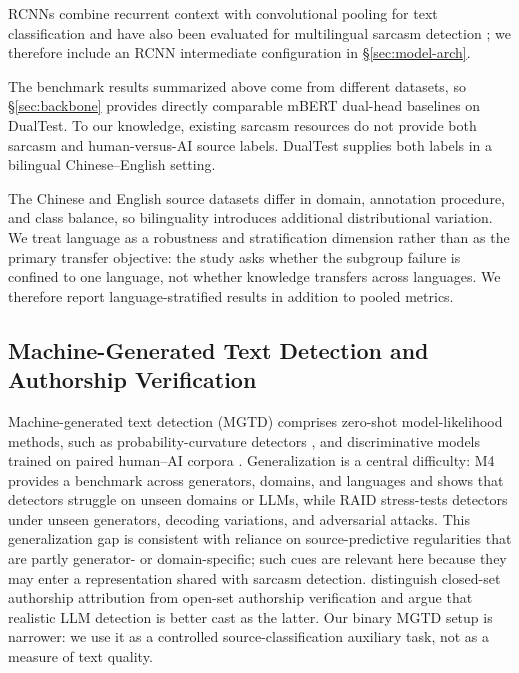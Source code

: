 \documentclass[11pt]{article}
\newcommand{\Sref}[1]{\hyperref[#1]{\S\ref*{#1}}}
\begin{document}
RCNNs combine recurrent context with convolutional pooling for text classification \citep{lai2015rcnn} and have also been evaluated for multilingual sarcasm detection \citep{yang2024influence}; we therefore include an RCNN intermediate configuration in \Sref{sec:model-arch}.

The benchmark results summarized above come from different datasets, so \Sref{sec:backbone} provides directly comparable mBERT dual-head baselines on DualTest. To our knowledge, existing sarcasm resources do not provide both sarcasm and human-versus-AI source labels. DualTest supplies both labels in a bilingual Chinese--English setting.

The Chinese and English source datasets differ in domain, annotation procedure, and class balance, so bilinguality introduces additional distributional variation. We treat language as a robustness and stratification dimension rather than as the primary transfer objective: the study asks whether the subgroup failure is confined to one language, not whether knowledge transfers across languages. We therefore report language-stratified results in addition to pooled metrics.

\subsection{Machine-Generated Text Detection and Authorship Verification}
\label{sec:related-ai}

Machine-generated text detection (MGTD) comprises zero-shot model-likelihood methods, such as probability-curvature detectors \citep{mitchell2023detectgpt}, and discriminative models trained on paired human--AI corpora \citep[HC3;][]{guo2023hc3}. Generalization is a central difficulty: M4 \citep{wang2024m4} provides a benchmark across generators, domains, and languages and shows that detectors struggle on unseen domains or LLMs, while RAID \citep{dugan2024raid} stress-tests detectors under unseen generators, decoding variations, and adversarial attacks. This generalization gap is consistent with reliance on source-predictive regularities that are partly generator- or domain-specific; such cues are relevant here because they may enter a representation shared with sarcasm detection. \citet{bevendorff2025} distinguish closed-set authorship attribution from open-set authorship verification and argue that realistic LLM detection is better cast as the latter. Our binary MGTD setup is narrower: we use it as a controlled source-classification auxiliary task, not as a measure of text quality.
\end{document}
